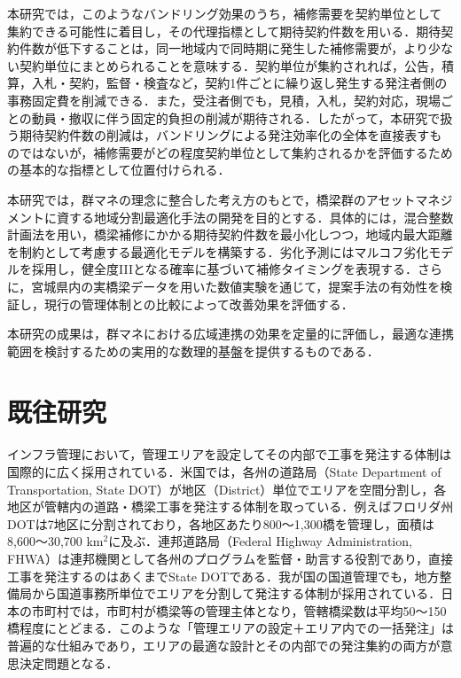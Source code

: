 \documentclass[Journal,letterpaper,InsideFigs,NoLineNumbers]{ascelike-new}
\begin{document}
本研究では，このようなバンドリング効果のうち，補修需要を契約単位として集約できる可能性に着目し，その代理指標として期待契約件数を用いる．期待契約件数が低下することは，同一地域内で同時期に発生した補修需要が，より少ない契約単位にまとめられることを意味する．契約単位が集約されれば，公告，積算，入札・契約，監督・検査など，契約1件ごとに繰り返し発生する発注者側の事務固定費を削減できる．また，受注者側でも，見積，入札，契約対応，現場ごとの動員・撤収に伴う固定的負担の削減が期待される．したがって，本研究で扱う期待契約件数の削減は，バンドリングによる発注効率化の全体を直接表すものではないが，補修需要がどの程度契約単位として集約されるかを評価するための基本的な指標として位置付けられる．

本研究では，群マネの理念に整合した考え方のもとで，橋梁群のアセットマネジメントに資する地域分割最適化手法の開発を目的とする．具体的には，混合整数計画法を用い，橋梁補修にかかる期待契約件数を最小化しつつ，地域内最大距離を制約として考慮する最適化モデルを構築する．劣化予測にはマルコフ劣化モデルを採用し，健全度IIIとなる確率に基づいて補修タイミングを表現する．さらに，宮城県内の実橋梁データを用いた数値実験を通じて，提案手法の有効性を検証し，現行の管理体制との比較によって改善効果を評価する．

本研究の成果は，群マネにおける広域連携の効果を定量的に評価し，最適な連携範囲を検討するための実用的な数理的基盤を提供するものである．

\section{既往研究}

インフラ管理において，管理エリアを設定してその内部で工事を発注する体制は国際的に広く採用されている．米国では，各州の道路局（State Department of Transportation, State DOT）が地区（District）単位でエリアを空間分割し，各地区が管轄内の道路・橋梁工事を発注する体制を取っている．例えばフロリダ州DOTは7地区に分割されており，各地区あたり800〜1,300橋を管理し，面積は8,600〜30,700 km\(^2\)に及ぶ\cite{fhwa2019}．連邦道路局（Federal Highway Administration, FHWA）は連邦機関として各州のプログラムを監督・助言する役割であり，直接工事を発注するのはあくまでState DOTである\cite{fhwafactsheet}．我が国の国道管理でも，地方整備局から国道事務所単位でエリアを分割して発注する体制が採用されている．日本の市町村では，市町村が橋梁等の管理主体となり，管轄橋梁数は平均50〜150橋程度にとどまる\cite{mlit2025gunmane}．このような「管理エリアの設定＋エリア内での一括発注」は普遍的な仕組みであり，エリアの最適な設計とその内部での発注集約の両方が意思決定問題となる．
\end{document}
